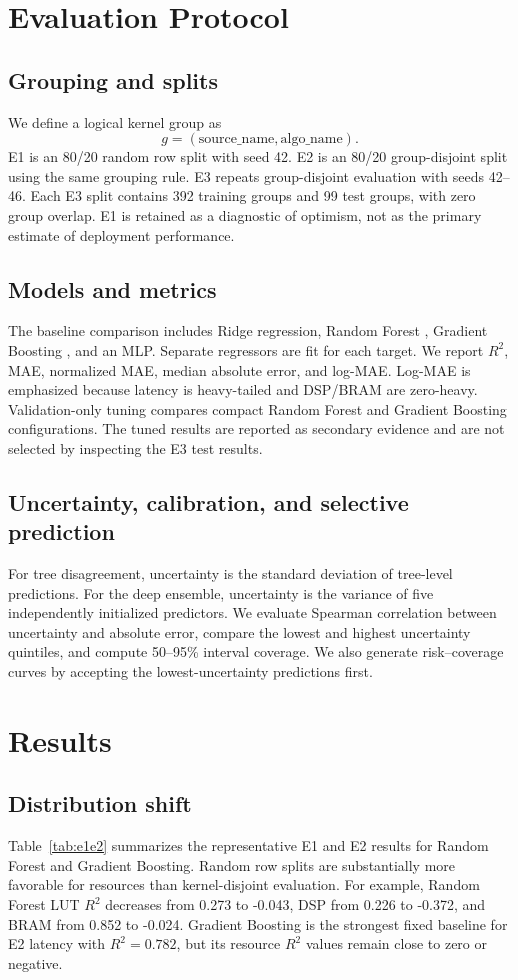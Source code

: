 \documentclass[conference]{IEEEtran}
\begin{document}
\section{Evaluation Protocol}
\subsection{Grouping and splits}
We define a logical kernel group as
\[
g=(\text{source\_name},\text{algo\_name}).
\]
E1 is an 80/20 random row split with seed 42. E2 is an 80/20 group-disjoint split using the same grouping rule. E3 repeats group-disjoint evaluation with seeds 42--46. Each E3 split contains 392 training groups and 99 test groups, with zero group overlap. E1 is retained as a diagnostic of optimism, not as the primary estimate of deployment performance.

\subsection{Models and metrics}
The baseline comparison includes Ridge regression, Random Forest \cite{breiman2001random}, Gradient Boosting \cite{friedman2001greedy}, and an MLP. Separate regressors are fit for each target. We report $R^2$, MAE, normalized MAE, median absolute error, and log-MAE. Log-MAE is emphasized because latency is heavy-tailed and DSP/BRAM are zero-heavy. Validation-only tuning compares compact Random Forest and Gradient Boosting configurations. The tuned results are reported as secondary evidence and are not selected by inspecting the E3 test results.

\subsection{Uncertainty, calibration, and selective prediction}
For tree disagreement, uncertainty is the standard deviation of tree-level predictions. For the deep ensemble, uncertainty is the variance of five independently initialized predictors. We evaluate Spearman correlation between uncertainty and absolute error, compare the lowest and highest uncertainty quintiles, and compute 50--95\% interval coverage. We also generate risk--coverage curves by accepting the lowest-uncertainty predictions first.

\section{Results}
\subsection{Distribution shift}
Table~\ref{tab:e1e2} summarizes the representative E1 and E2 results for Random Forest and Gradient Boosting. Random row splits are substantially more favorable for resources than kernel-disjoint evaluation. For example, Random Forest LUT $R^2$ decreases from 0.273 to -0.043, DSP from 0.226 to -0.372, and BRAM from 0.852 to -0.024. Gradient Boosting is the strongest fixed baseline for E2 latency with $R^2=0.782$, but its resource $R^2$ values remain close to zero or negative.
\end{document}
